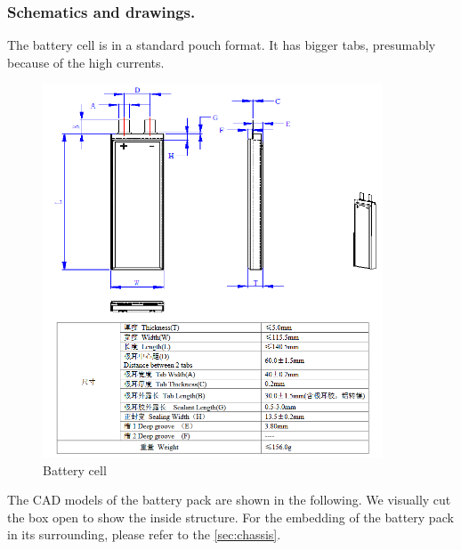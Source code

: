 \subsubsection{Schematics and drawings.}
The battery cell is in a standard pouch format. It has bigger tabs, presumably because of the high currents.
\begin{figure}[H]
    \centering
    \includegraphics[width=0.9\textwidth]{texfiles/elec/eimg/BatteryCell}
    \caption{Battery cell}
    \label{img: Batterycell}
\end{figure}

The CAD models of the battery pack are shown in the following. We visually cut the box open to show the inside structure. For the embedding of the battery pack in its surrounding, please refer to the \ref{sec:chassis}. \\

